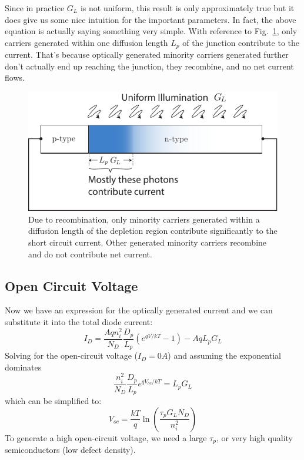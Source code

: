 Since in practice $G_L$ is not uniform, this result is only approximately true but it does give us some nice intuition for the important parameters.   In fact, the above equation is actually saying something very simple.  With reference to Fig.~\ref{fig:solar_cell_region}, only carriers generated within one diffusion length $L_p$ of the junction contribute to the current.  That's because optically generated minority carriers generated further don't actually end up reaching the junction, they recombine, and no net current flows.
\begin{figure}[tb]
\centering
\includegraphics[width=.5\columnwidth]{solar_cell_region}
\caption{Due to recombination, only minority carriers generated within a diffusion length of the depletion region contribute significantly to the short circuit current.  Other generated minority carriers recombine and do not contribute net current.}
\label{fig:solar_cell_region}
\end{figure}
\subsection{Open Circuit Voltage}
Now we have an expression for the optically generated current and we can substitute it into the total diode current:
    \begin{equation} 
        I_D = \frac{A q n_i^2}{N_D} \frac{D_p}{L_p}  (e^{qV/kT} - 1) - A q L_p G_L 
    \end{equation}
Solving for the open-circuit voltage ($I_D = 0A$) and assuming the exponential dominates
    \begin{equation} 
        \frac{  n_i^2}{N_D} \frac{D_p}{L_p}  e^{qV_{oc} /kT}  =  L_p G_L 
    \end{equation}
which can be simplified to:
    \begin{equation} 
        V_{oc} = \frac{kT}{q} \ln \left( \frac{\tau_p G_L N_D}{n_i^2} \right) 
    \end{equation}
To generate a high open-circuit voltage, we need a large $\tau_p$, or very high quality semiconductors (low defect density).
